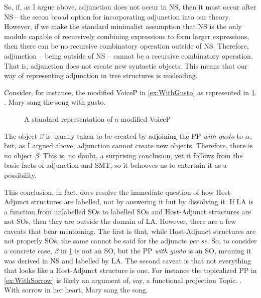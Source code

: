 \documentclass[MilwayThesis]{subfiles}
\begin{document}
So, if, as I argue above, adjunction does not occur in NS, then it must occur after NS---the secon broad option for incorporating adjunction into our theory.
However, if we make the standard minimalist assumption that NS is the only module capable of recursively combining expressions to form larger expressions, then there can be no recursive combinatory operation outside of NS.
Therefore, adjunction -- being outside of NS -- cannot be a recursive combinatory operation. 
That is, adjunction does not create new syntactic objects.
This means that our way of representing adjunction in tree structures is misleading.

Consider, for instance, the modified VoiceP in \cref{ex:WithGusto} as represented in \cref{fig:WithGusto}.
\ex. Mary sang the song with gusto.\label{ex:WithGusto}

\begin{figure}[h]
	\caption{A standard representation of a modified VoiceP}
	\label{fig:WithGusto}
\end{figure}
The object $\beta$ is usually taken to be created by adjoining the PP \textit{with gusto} to $\alpha$, but, as I argued above, adjunction cannot create new objects.
Therefore, there is no object $\beta$.
This is, no doubt, a surprising conclusion, yet it follows from the basic facts of adjunction and SMT, so it behooves us to entertain it as a possibility.

This conclusion, in fact, does resolve the immediate question of how Host-Adjunct structures are labelled, not by answering it but by dissolving it.
If LA is a function from unlabelled SOs to labelled SOs and Host-Adjunct structures are not SOs, then they are outside the domain of LA.
However, there are a few caveats that bear mentioning.
The first is that, while Host-Adjunct structures are not properly SOs, the same cannot be said for the adjuncts \textit{per se}.
So, to consider a concrete case, $\beta$ in \cref{fig:WithGusto} is not an SO, but the PP \textit{with gusto} is an SO, meaning it was derived in NS and labelled by LA.
The second caveat is that not everything that looks like a Host-Adjunct structure is one.
For instance the topicalized PP in \cref{ex:WithSorrow} is likely an argument of, say, a functional projection Topic.
\ex.\label{ex:WithSorrow} With sorrow in her heart, Mary sang the song.
\end{document}
